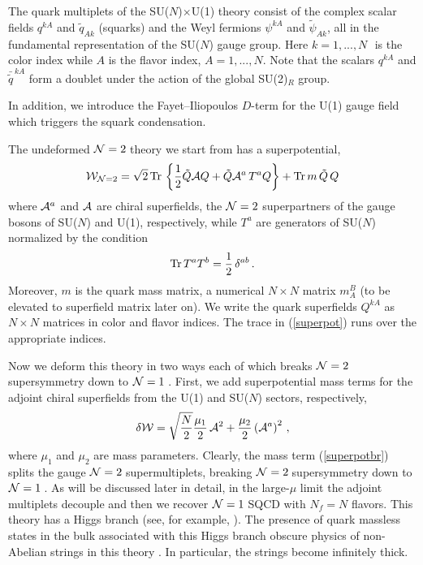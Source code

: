 \documentclass[epsfig,12pt]{article}
\def\beq{\begin{equation}}
\def\eeq{\end{equation}}
\newcommand{\ntwo}{${\cal N}=2\;$}
\newcommand{\none}{${\cal N}=1\;$}
\begin{document}
 \vspace{2mm}

The quark multiplets of  the SU($N$)$\times$U(1) theory consist
of   the complex scalar fields
$q^{kA}$ and $\tilde{q}_{Ak}$ (squarks) and
the  Weyl fermions $\psi^{kA}$ and
$\tilde{\psi}_{Ak}$,
 all in the fundamental representation of the  SU($N$)  gauge group.
Here $k=1,..., N\,\,$ is the color index
while $A$ is the flavor index, $A=1,...,N$.
Note that the scalars $q^{kA}$ and ${\bar{\tilde q}}^{\, kA}$
 form a doublet under the action of the   global
 SU(2)$_R$ group.

In addition, we
introduce the Fayet--Iliopoulos   $D$-term for the U(1) gauge field
which triggers the squark condensation.

The undeformed \ntwo theory we start from has a superpotential, 
 \beq
{\cal W}_{{\cal N}=2} =\sqrt 2 \,{\rm Tr}\,
\left\{\frac12 \tilde Q {\cal A}
Q +  \tilde Q {\cal A}^a\,T^a  Q\right\}+ {\rm Tr}\, m \, \tilde Q\, Q 
\label{superpot}
\eeq
where ${\cal A}^a$ and ${\cal A}$ are  chiral superfields, the ${\cal N}=2$
superpartners of the gauge bosons of SU($N$)  and  U(1), respectively,
while $T^a$ are generators of SU($N$)
normalized by the condition
 $${\rm Tr}\,T^a T^b =\frac{1}{2}\,\delta^{ab}\,.$$
 Moreover, $m$ is the quark mass matrix, a numerical
 $N\times N$ matrix $m^B_A$ (to be elevated to superfield matrix later on). 
We write the quark superfields $Q^{kA}$ as $N\times N$ matrices in color and
flavor indices. The trace in (\ref{superpot}) runs over the appropriate 
indices. 
 
 \vspace{2mm}

Now we deform this theory in two ways each of which breaks \ntwo
supersym\-metry down to \none. First, we 
add   superpotential mass terms for the adjoint chiral superfields
from the U(1) and SU($N$) sectors, respectively,
\beq
\delta{\cal W} =\sqrt{\frac{N}{2}}\frac{\mu_1}{2}\,  {\cal A}^2
+ \frac{\mu_2}{2} \left({\cal A}^a\right)^2\, ,
\label{superpotbr}
\eeq
where $\mu_1$ and $\mu_2$ are mass parameters. Clearly, the mass term
(\ref{superpotbr}) splits the gauge  \ntwo supermultiplets, breaking
\ntwo supersymmetry down to \none.
As will be discussed later in detail, in the large-$\mu$ limit the adjoint
multiplets decouple and then we recover \none SQCD 
with $N_f=N$ flavors. This theory has a Higgs branch (see, for example,  \cite{IS}).
The presence of quark massless states in the bulk
associated with this Higgs branch obscure physics of  non-Abelian strings
in this theory \cite{SYnone}. In particular, the strings become infinitely thick.
\end{document}
